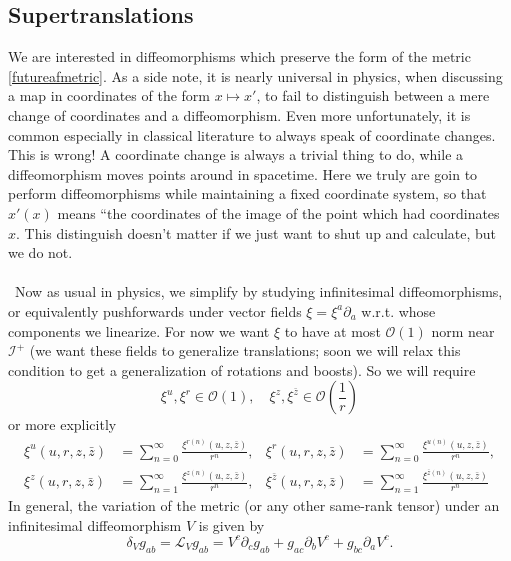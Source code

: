 \documentclass[11pt,letterpaper]{article}
\newcommand{\LP}{\left(}
\newcommand{\RP}{\right)}
\newcommand{\mc}[1]{\mathcal{#1}}
\newcommand{\D}{\partial}
\begin{document}
\subsection{Supertranslations}
We are interested in diffeomorphisms which preserve the form of the metric \eqref{futureafmetric}. As a side note, it is nearly universal in physics, when discussing a map in coordinates of the form $x \mapsto x'$, to fail to distinguish between a mere change of coordinates and a diffeomorphism. Even more unfortunately, it is common especially in classical literature to always speak of coordinate changes. This is wrong! A coordinate change is always a trivial thing to do, while a diffeomorphism moves points around in spacetime. Here we truly are goin to perform diffeomorphisms while maintaining a fixed coordinate system, so that $x'(x)$ means ``the coordinates of the image of the point which had coordinates $x$. This distinguish doesn't matter if we just want to shut up and calculate, but we do not.\\
\\
\
Now as usual in physics, we simplify by studying infinitesimal diffeomorphisms, or equivalently pushforwards under vector fields $\xi = \xi^a \D_a$ w.r.t. whose components we linearize. For now we want $\xi$ to have at most $\mc{O}(1)$ norm near $\mc{I}^+$ (we want these fields to generalize translations; soon we will relax this condition to get a generalization of rotations and boosts). So we will require \begin{equation}
\xi^u, \xi^r \in \mc{O}(1), \quad \xi^z, \xi^{\bar{z}} \in \mc{O} \LP \frac{1}{r} \RP
\end{equation}
or more explicitly \begin{equation}
\begin{aligned}
\xi^u(u,r,z,\bar{z}) & = \sum_{n=0}^\infty \frac{\xi^{r(n)}(u, z, \bar{z})}{r^n}, & \xi^r(u,r,z,\bar{z}) & = \sum_{n=0}^\infty \frac{\xi^{u(n)}(u, z, \bar{z})}{r^n}, \\
\xi^z(u,r,z,\bar{z}) & = \sum_{n=1}^\infty \frac{\xi^{z(n)}(u, z, \bar{z})}{r^n}, & \xi^{\bar{z}} (u,r,z,\bar{z}) & = \sum_{n=1}^\infty \frac{\xi^{\bar{z}(n)}(u, z, \bar{z})}{r^n}
\end{aligned}
\end{equation}
In general, the variation of the metric (or any other same-rank tensor) under an infinitesimal diffeomorphism $V$ is given by \begin{equation}
\delta_V g_{ab} = \mc{L}_V g_{ab} = V^c \D_c g_{ab} + g_{ac} \D_b V^c + g_{bc} \D_a V^c.
\end{equation}
\end{document}
